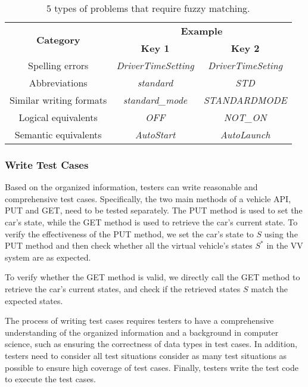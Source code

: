 \begin{table}[h]
  \centering
  \caption{5 types of problems that require fuzzy matching.}
  \begin{tabular}{|c|c|c|}
  \hline
  \multirow{2}{*}{\centering \textbf{Category}} & \multicolumn{2}{|c|}{\textbf{Example}} \\
  \cline{2-3}
   & \textbf{Key 1} & \textbf{Key 2} \\
  \hline
  Spelling errors & \textit{DriverTimeSetting} & \textit{DriverTimeSeting} \\
  \hline
  Abbreviations & \textit{standard} & \textit{STD} \\
  \hline
  Similar writing formats & \textit{standard\_mode} & \textit{STANDARDMODE} \\
  \hline
  Logical equivalents & \textit{OFF} & \textit{NOT\_ON} \\
  \hline
  Semantic equivalents & \textit{AutoStart} & \textit{AutoLaunch} \\
  \hline
  \end{tabular}
  \label{table:examples2}
\end{table}

\subsubsection{Write Test Cases}
Based on the organized information, testers can write reasonable and comprehensive test cases. 
Specifically, the two main methods of a vehicle API, PUT and GET, need to be tested separately. The PUT method is used to set the car's state, while the GET method is used to retrieve the car's current state.
To verify the effectiveness of the PUT method, we set the car's state to \( S \) using the PUT method and then check whether all the virtual vehicle's states $S^{*}$ in the VV system are as expected.


To verify whether the GET method is valid, we directly call the GET method to retrieve the car's current states, and check if the retrieved states \( S \) match the expected states.


The process of writing test cases requires testers to have a comprehensive understanding of the organized information and a background in computer science, such as ensuring the correctness of data types in test cases. In addition, testers need to consider all test situations consider as many test situations as possible to ensure high coverage of test cases.
Finally, testers write the test code to execute the test cases. 


